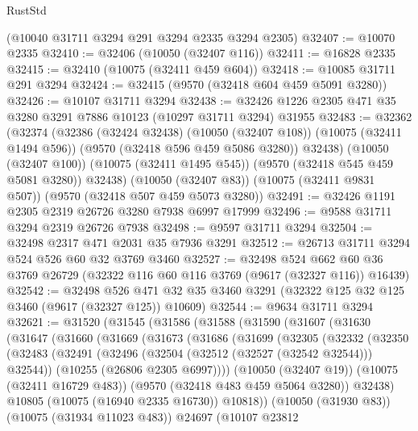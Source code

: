 \begin{lexlean}{RustStd}
\begin{coremodule}
    (@10040 @31711 @3294 @291 @3294 @2335 @3294 @2305)
@32407 := @10070 @2335
@32410 := @32406 (@10050 (@32407 @116))
@32411 := @16828 @2335
@32415 := @32410 (@10075 (@32411 @459 @604))
@32418 := @10085 @31711 @291 @3294
@32424 := @32415 (@9570 (@32418 @604 @459 @5091 @3280))
@32426 := @10107 @31711 @3294
@32438 := @32426 @1226 @2305 @471 @35 @3280 @3291 @7886 @10123 (@10297 @31711 @3294) @31955
@32483 := @32362
    (@32374
      (@32386
        (@32424 @32438)
        (@10050 (@32407 @108))
        (@10075 (@32411 @1494 @596))
        (@9570 (@32418 @596 @459 @5086 @3280))
        @32438)
      (@10050 (@32407 @100))
      (@10075 (@32411 @1495 @545))
      (@9570 (@32418 @545 @459 @5081 @3280))
      @32438)
    (@10050 (@32407 @83))
    (@10075 (@32411 @9831 @507))
    (@9570 (@32418 @507 @459 @5073 @3280))
@32491 := @32426 @1191 @2305 @2319 @26726 @3280 @7938 @6997 @17999
@32496 := @9588 @31711 @3294 @2319 @26726 @7938
@32498 := @9597 @31711 @3294
@32504 := @32498 @2317 @471 @2031 @35 @7936 @3291
@32512 := @26713 @31711 @3294 @524 @526 @60 @32 @3769 @3460
@32527 := @32498
    @524
    @662
    @60
    @36
    @3769
    @26729
    (@32322 @116 @60 @116 @3769 (@9617 (@32327 @116)) @16439)
@32542 := @32498
    @526
    @471
    @32
    @35
    @3460
    @3291
    (@32322 @125 @32 @125 @3460 (@9617 (@32327 @125)) @10609)
@32544 := @9634 @31711 @3294
@32621 := @31520
    (@31545
      (@31586
        (@31588
          (@31590
            (@31607
              (@31630
                (@31647
                  (@31660
                    (@31669
                      (@31673
                        (@31686
                          (@31699
                            (@32305
                              (@32332
                                (@32350
                                  (@32483
                                    (@32491
                                      (@32496 (@32504 (@32512 (@32527 (@32542 @32544))) @32544))
                                      (@10255 (@26806 @2305 @6997))))
                                  (@10050 (@32407 @19))
                                  (@10075 (@32411 @16729 @483))
                                  (@9570 (@32418 @483 @459 @5064 @3280))
                                  @32438)
                                @10805
                                (@10075 (@16940 @2335 @16730))
                                @10818))
                            (@10050 (@31930 @83))
                            (@10075 (@31934 @11023 @483))
                            @24697
                            (@10107
                              @23812

\end{coremodule}
\end{lexlean}

